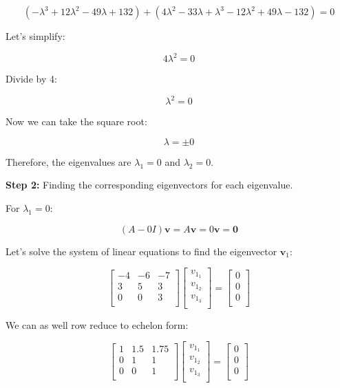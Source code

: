 \documentclass{article}
\begin{document}
\[
(-\lambda^3 + 12\lambda^2 - 49\lambda + 132) + (4\lambda^2 - 33\lambda + \lambda^3 - 12\lambda^2 + 49\lambda - 132) = 0
\]

Let's simplify:

\[
4\lambda^2 = 0
\]

Divide by 4:

\[
\lambda^2 = 0
\]

Now we can take the square root:

\[
\lambda = \pm 0
\]

Therefore, the eigenvalues are \(\lambda_1 = 0\) and \(\lambda_2 = 0\).

\textbf{Step 2:} Finding the corresponding eigenvectors for each eigenvalue.

For \(\lambda_1 = 0\):

\[
(A - 0I)\mathbf{v} = A\mathbf{v} = 0\mathbf{v} = \mathbf{0}
\]

Let's solve the system of linear equations to find the eigenvector \(\mathbf{v}_1\):

\[
\begin{bmatrix}
-4 & -6 & -7 \\
3 & 5 & 3 \\
0 & 0 & 3 \\
\end{bmatrix}
\begin{bmatrix}
v_{1_1} \\
v_{1_2} \\
v_{1_3} \\
\end{bmatrix}
=
\begin{bmatrix}
0 \\
0 \\
0 \\
\end{bmatrix}
\]

We can as well row reduce to echelon form:

\[
\begin{bmatrix}
1 & 1.5 & 1.75 \\
0 & 1 & 1 \\
0 & 0 & 1 \\
\end{bmatrix}
\begin{bmatrix}
v_{1_1} \\
v_{1_2} \\
v_{1_3} \\
\end{bmatrix}
=
\begin{bmatrix}
0 \\
0 \\
0 \\
\end{bmatrix}
\]
\end{document}
